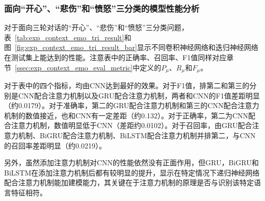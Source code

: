 \subsubsection{面向“开心”、“悲伤”和“愤怒”三分类的模型性能分析}
\label{sssec:exp_context_emo_tri_base}

对于面向三轮对话的“开心”、“悲伤”和“愤怒”三分类问题，表~\ref{tab:exp_context_emo_tri_result}和图~\ref{fig:exp_context_emo_tri_result_bar}显示不同卷积神经网络和迭归神经网络在测试集上能达到的性能。注意表中的正确率、召回率、F1值同样对应章节~\ref{ssec:exp_context_emo_eval_metric}中定义的$P_\mu$、$R_\mu$和$F_\mu$。

对于表中的四个指标，均由CNN达到最好的效果。对于F1值，排第二和第三的分别是CNN配合注意力机制以及GRU配合注意力机制，两者和CNN的F1值差距明显（约0.0179）。对于准确率，第二的GRU配合注意力机制和第三的CNN配合注意力机制的数值接近，也和CNN有一定差距（约0.132）。对于正确率，第二为CNN配合注意力机制，数值明显低于CNN（差距约0.0102）。对于召回率，由GRU配合注意力机制、BiGRU配合注意力机制、BiLSTM配合注意力机制并排第二，与CNN的召回率差距明显（约0.0219）。

另外，虽然添加注意力机制对CNN的性能依然没有正面作用，但GRU，BiGRU和BiLSTM在添加注意力机制后都有较明显的提升，显示在特定情况下递归神经网络配合注意力机制能加建模能力，其关键在于注意力机制的原理是否与识别该特定语言特征相符。

